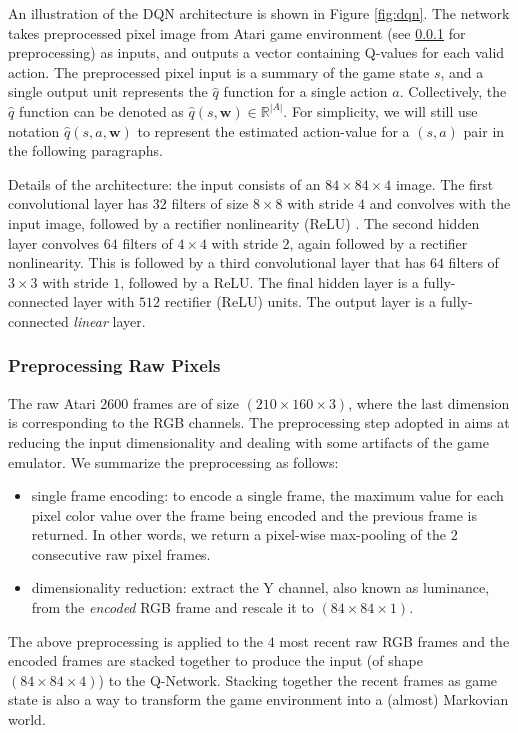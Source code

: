 \documentclass{article}
\newcommand{\w}{\mathbf{w}}
\begin{document}
An illustration of the DQN architecture is shown in Figure \ref{fig:dqn}. The network takes preprocessed pixel image from Atari game environment (see \ref{sec_preprocessing} for preprocessing) as inputs, and outputs a vector containing Q-values for each valid action. The preprocessed pixel input is a summary of the game state $s$, and a single output unit represents the $\hat{q}$ function for a single action $a$. Collectively, the $\hat{q}$ function can be denoted as $\hat{q}(s, \w) \in \mathbb{R}^{|A|}$. For simplicity, we will still use notation $\hat{q}(s, a, \w)$ to represent the estimated action-value for a $(s,a)$ pair in the following paragraphs.

Details of the architecture: the input consists of an $84 \times 84 \times 4$ image. The first convolutional layer has $32$ filters of size $8 \times 8$ with stride $4$ and convolves with the input image, followed by a rectifier nonlinearity (ReLU) \cite{ref_relu}. The second hidden layer convolves $64$ filters of $4 \times 4$ with stride $2$, again followed by a rectifier nonlinearity. This is followed by a third convolutional layer that has $64$ filters of $3 \times 3$ with stride $1$, followed by a ReLU. The final hidden layer is a fully-connected layer with $512$ rectifier (ReLU) units. The output layer is a fully-connected \textit{linear} layer.

\subsubsection{Preprocessing Raw Pixels}
\label{sec_preprocessing}
The raw Atari 2600 frames are of size $(210 \times 160 \times 3)$, where the last dimension is corresponding to the RGB channels. The preprocessing step adopted in \cite{ref_DQN} aims at reducing the input dimensionality and dealing with some artifacts of the game emulator. We summarize the preprocessing as follows:
\begin{itemize}
\item
single frame encoding: to encode a single frame, the maximum value for each pixel color value over the frame being encoded and the previous frame is returned. In other words, we return a pixel-wise max-pooling of the $2$ consecutive raw pixel frames.
\item
dimensionality reduction: extract the Y channel, also known as luminance, from the \textit{encoded} RGB frame and rescale it to $(84 \times 84 \times 1)$.
\end{itemize}
The above preprocessing is applied to the $4$ most recent raw RGB frames and the encoded frames are stacked together to produce the input (of shape $(84 \times 84 \times 4)$) to the Q-Network. Stacking together the recent frames as game state is also a way to transform the game environment into a (almost) Markovian world.
\end{document}
